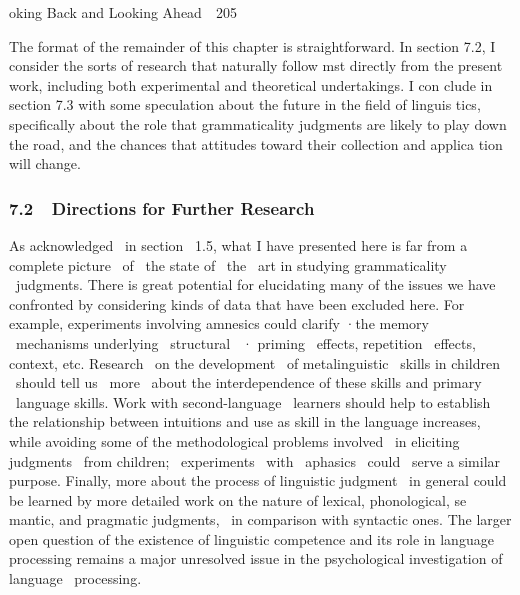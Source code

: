 \clearpage\setcounter{page}{1}\begin{styleStandard}
oking Back and Looking Ahead\ \ 205
\end{styleStandard}


\begin{styleStandard}
The format of the remainder of this chapter is straightforward. In section 7.2, I consider the sorts of research that naturally follow mst directly from the present work, including both experimental and theoretical undertakings. I con\- clude in section 7.3 with some speculation about the future in the field of linguis\- tics, specifically about the role that grammaticality judgments are likely to play down the road, and the chances that attitudes toward their collection and applica\- tion will change.
\end{styleStandard}


\subsubsection[7.2\ \ Directions for Further Research]{\textmd{7.2\ \ }Directions for Further Research}
\begin{styleStandard}
As acknowledged \ in section \ 1.5, what I have presented here is far from a complete picture \ of \ the state of \ the \ art in studying grammaticality \ judgments. There is great potential for elucidating many of the issues we have confronted by considering kinds of data that have been excluded here. For example, experiments involving amnesics could clarify ·the memory \ mechanisms underlying \ structural \ · priming \ effects, repetition \ effects, context, etc. Research \ on the development \ of metalinguistic \ skills in children \ should tell us \ more \ about the interdependence of these skills and primary \ language skills. Work with second-language \ learners should help to establish the relationship between intuitions and use as skill in the language increases, while avoiding some of the methodological problems involved \ in eliciting judgments \ from children; \ experiments \ with \ aphasics \ could \ serve a similar purpose. Finally, more about the process of linguistic judgment \ in general could be learned by more detailed work on the nature of lexical, phonological, se\- mantic, and pragmatic judgments, \ in comparison with syntactic ones. The larger open question of the existence of linguistic competence and its role in language processing remains a major unresolved issue in the psychological investigation of language \ processing.
\end{styleStandard}


